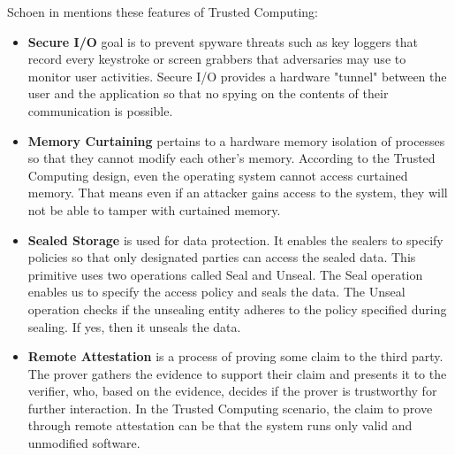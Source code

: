 Schoen in \cite{schoen2003trusted} mentions these features of Trusted Computing:

\begin{itemize}


\item \textbf{Secure I/O} goal is to prevent spyware threats such as key loggers that record every keystroke or screen grabbers that adversaries may use to monitor user activities. Secure I/O provides a hardware "tunnel" between the user and the application so that no spying on the contents of their communication is possible.

\item \textbf{Memory Curtaining} pertains to a hardware memory isolation of processes so that they cannot modify each other's memory. According to the Trusted Computing design, even the operating system cannot access curtained memory. That means even if an attacker gains access to the system, they will not be able to tamper with curtained memory.

\item \textbf{Sealed Storage} is used for data protection. It enables the sealers to specify policies so that only designated parties can access the sealed data. This primitive uses two operations called Seal and Unseal. The Seal operation enables us to specify the access policy and seals the data. The Unseal operation checks if the unsealing entity adheres to the policy specified during sealing. If yes, then it unseals the data.

\item \textbf{Remote Attestation} is a process of proving some claim to the third party. The prover gathers the evidence to support their claim and presents it to the verifier, who, based on the evidence, decides if the prover is trustworthy for further interaction. In the Trusted Computing scenario, the claim to prove through remote attestation can be that the system runs only valid and unmodified software. 
\end{itemize}


